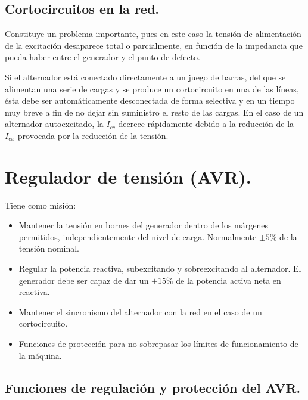	\subsection{Cortocircuitos en la red.}	
		Constituye un problema importante, pues en este caso la tensión de alimentación de la excitación desaparece total o parcialmente, en función de la impedancia que pueda haber entre el generador y el punto de defecto.
		
		
		Si el alternador está conectado directamente a un juego de barras, del que se alimentan una serie de cargas y se produce un cortocircuito en una de las líneas, ésta debe ser automáticamente desconectada de forma selectiva y en un tiempo muy breve a fin de no dejar sin suministro el resto de las cargas. En el caso de un alternador autoexcitado, la $I_{cc}$ decrece rápidamente debido a la reducción de la $I_{ex}$ provocada por la reducción de la tensión.
		
	\section{Regulador de tensión (AVR).}
		Tiene como misión:
		\begin{itemize}
			\item Mantener la tensión en bornes del generador dentro de los márgenes permitidos, independientemente del nivel de carga. Normalmente $\pm5\%$ de la tensión nominal.
			\item Regular la potencia reactiva, subexcitando y sobreexcitando al alternador. El generador debe ser capaz de dar un $\pm15\%$ de la potencia activa neta en reactiva.
			\item Mantener el sincronismo del alternador con la red en el caso de un cortocircuito.
			\item Funciones de protección para no sobrepasar los límites de funcionamiento de la máquina.
		\end{itemize}
		
		\subsection{Funciones de regulación y protección del AVR.}
			
